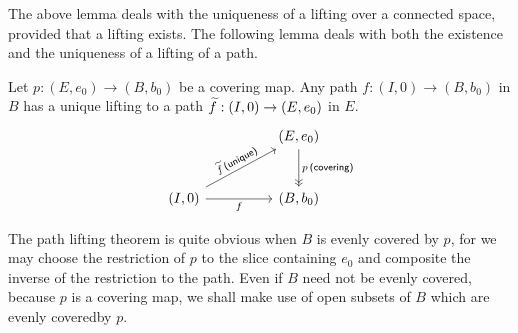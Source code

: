 The above lemma deals with the uniqueness of a lifting over a connected space, provided that a lifting exists.
The following lemma deals with both the existence and the uniqueness of a lifting of a path.
\begin{thm}
    Let $p: (E, e_0)\rightarrow (B, b_0)$ be a covering map.
    Any path $f: (I, 0)\rightarrow (B, b_0)$ in $B$ has a unique lifting to a path $\widetilde{f}: (I, 0)\rightarrow (E, e_0)$ in $E$.
    \begin{equation*}
    \begin{tikzcd}[row sep=large, column sep=huge]
        &
        (E, e_0)
        \arrow[d, "p\,\textsf{(covering)}", ->>]
        \\
        (I, 0)
        \arrow[ur, "\wt{f}\,\textsf{(unique)}"sloped]
        \arrow[r, "f"']
        &
        (B, b_0)
    \end{tikzcd}
    \end{equation*}
\end{thm}
\begin{rmk}
    The path lifting theorem is quite obvious when $B$ is evenly covered by $p$, for we may choose the restriction of $p$ to the slice containing $e_0$ and composite the inverse of the restriction to the path.
    Even if $B$ need not be evenly covered, because $p$ is a covering map, we shall make use of open subsets of $B$ which are evenly coveredby $p$.
\end{rmk}
